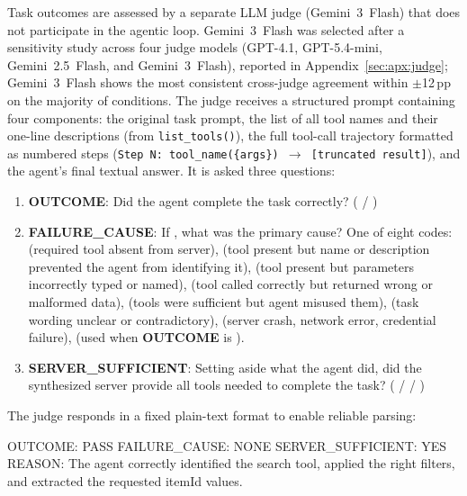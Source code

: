 Task outcomes are assessed by a separate LLM judge (Gemini~3~Flash) that does not participate in the agentic loop. Gemini~3~Flash was selected after a sensitivity study across four judge models (GPT-4.1, GPT-5.4-mini, Gemini~2.5~Flash, and Gemini~3~Flash), reported in Appendix~\ref{sec:apx:judge}; Gemini~3~Flash shows the most consistent cross-judge agreement within $\pm$12\,pp on the majority of conditions. The judge receives a structured prompt containing four components: the original task prompt, the list of all tool names and their one-line descriptions (from \texttt{list\_tools()}), the full tool-call trajectory formatted as numbered steps (\texttt{Step N: tool\_name(\{args\}) $\rightarrow$ [truncated result]}), and the agent's final textual answer. It is asked three questions:

\begin{enumerate}
  \item \textbf{OUTCOME}: Did the agent complete the task correctly?
    ( / )
  \item \textbf{FAILURE\_CAUSE}: If , what was the primary cause?
    One of eight codes:
     (required tool absent from server),
     (tool present but name or description
    prevented the agent from identifying it),
     (tool present but parameters incorrectly typed
    or named),
     (tool called correctly but returned wrong
    or malformed data),
     (tools were sufficient but agent misused them),
     (task wording unclear or contradictory),
     (server crash, network error, credential failure),
     (used when \textbf{OUTCOME} is ).
  \item \textbf{SERVER\_SUFFICIENT}: Setting aside what the agent did,
    did the synthesized server provide all tools needed to complete the task?
    ( /  / )
\end{enumerate}

\noindent
The judge responds in a fixed plain-text format to enable reliable parsing:


\begin{JudgeBox}
OUTCOME: PASS
FAILURE_CAUSE: NONE
SERVER_SUFFICIENT: YES
REASON: The agent correctly identified the search tool, applied the right filters, and extracted the requested itemId values.
\end{JudgeBox}


